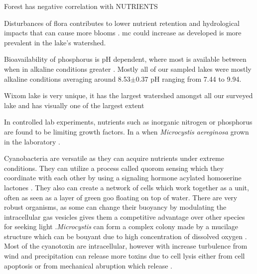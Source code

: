 Forest has negative correlation with NUTRIENTS

Disturbances of flora contributes to lower nutrient retention and hydrological impacts that can cause more blooms \cite{anderson_harmful_2002, codd_cyanobacterial_2000, fraterrigo_influence_2008}.
\gls{mc} could increase as developed is more prevalent in the lake's watershed.


Bioavailability of phosphorus is pH dependent, where most is available between when in alkaline conditions greater \cite{lucas_relationships_1961}.
Mostly all of our sampled lakes were mostly alkaline conditions averaging around 8.53$\pm$0.37 pH ranging from 7.44 to 9.94.

Wixom lake is very unique, it has the largest watershed amongst all our surveyed lake and has visually one of the largest extent



In controlled lab experiments, nutrients such as inorganic nitrogen or phosphorus are found to be limiting growth factors. In a  when \emph{Microcystis aereginosa} grown in the laboratory \cite{xiao_colony_2018, yema_role_2016}.

Cyanobacteria are versatile as they can acquire nutrients under extreme conditions. They can utilize a process called quorom sensing which they coordinate with each other by using a signaling hormone acylated homoserine lactones \cite{van_mooy_quorum_2012}. They also can create a network of cells which work together as a unit, often as seen as a layer of green goo floating on top of water.  There are very robust organisms, as some can change their buoyancy by modulating the intracellular gas vesicles gives them a competitive advantage over other species for seeking light \cite{feng_how_2018}.\emph{Microcystis} can form a complex colony made by a mucilage structure which can be bouyant due to high concentration of dissolved oxygen \cite{xiao_colony_2018}. %
Most of the cyanotoxin are intracellular, however with increase turbulence from wind and precipitation can release more toxins due to cell lysis either from cell apoptosis or from mechanical abruption which release \cite{rohrlack_fate_2007}. %





